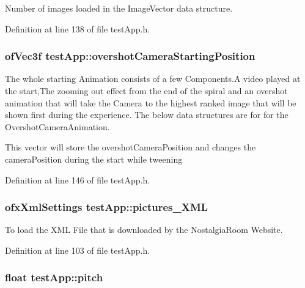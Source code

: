 Number of images loaded in the Image\-Vector data structure. 



Definition at line 138 of file test\-App.\-h.

\hypertarget{classtest_app_a846feea7c2c4d4b1929bb72c546b3e19}{
\subsubsection[{overshot\-Camera\-Starting\-Position}]{\setlength{\rightskip}{0pt plus 5cm}of\-Vec3f test\-App\-::overshot\-Camera\-Starting\-Position}}\label{classtest_app_a846feea7c2c4d4b1929bb72c546b3e19}


The whole starting Animation consists of a few Components.\-A video played at the start,The zooming out effect from the end of the spiral and an overshot animation that will take the Camera to the highest ranked image that will be shown first during the experience. The below data structures are for for the Overshot\-Camera\-Animation. 

This vector will store the overshot\-Camera\-Position and changes the camera\-Position during the start while tweening 

Definition at line 146 of file test\-App.\-h.

\hypertarget{classtest_app_a85133f49103cfa002f39d882f7168236}{
\subsubsection[{pictures\-\_\-\-X\-M\-L}]{\setlength{\rightskip}{0pt plus 5cm}ofx\-Xml\-Settings test\-App\-::pictures\-\_\-\-X\-M\-L}}\label{classtest_app_a85133f49103cfa002f39d882f7168236}


To load the X\-M\-L File that is downloaded by the Nostalgia\-Room Website. 



Definition at line 103 of file test\-App.\-h.

\hypertarget{classtest_app_aabbebeb113838374f659e86a0355b260}{
\subsubsection[{pitch}]{\setlength{\rightskip}{0pt plus 5cm}float test\-App\-::pitch}}\label{classtest_app_aabbebeb113838374f659e86a0355b260}


